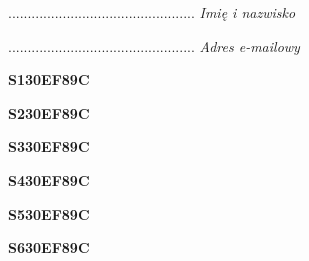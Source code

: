 \begin{turn}{90}\begin{minipage}{\linewidth} \vspace{20mm} ................................................  \textit{Imię i nazwisko}\end{minipage}\end{turn}

\begin{turn}{90}\begin{minipage}{\linewidth} \vspace{20mm} ................................................  \textit{Adres e-mailowy}\end{minipage}\end{turn}

\begin{turn}{90}\huge \begin{minipage}{\linewidth} \vspace{10mm}\textbf{S130EF89C}\end{minipage}\end{turn}

\begin{turn}{90}\huge \begin{minipage}{\linewidth} \vspace{10mm}\textbf{S230EF89C}\end{minipage}\end{turn}

\begin{turn}{90}\huge \begin{minipage}{\linewidth} \vspace{10mm}\textbf{S330EF89C}\end{minipage}\end{turn}

\begin{turn}{90}\huge \begin{minipage}{\linewidth} \vspace{10mm}\textbf{S430EF89C}\end{minipage}\end{turn}

\begin{turn}{90}\huge \begin{minipage}{\linewidth} \vspace{10mm}\textbf{S530EF89C}\end{minipage}\end{turn}

\begin{turn}{90}\huge \begin{minipage}{\linewidth} \vspace{10mm}\textbf{S630EF89C}\end{minipage}\end{turn}

